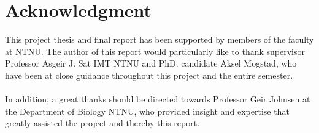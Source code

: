 \chapter*{Acknowledgment}
This project thesis and final report has been supported by members of the faculty at NTNU. The author of this report would particularly like to thank supervisor Professor Asgeir J. S at IMT NTNU and PhD. candidate Aksel Mogstad, who have been at close guidance throughout this project and the entire semester. 
\\\\
In addition, a great thanks should be directed towards Professor Geir Johnsen at the Department of Biology NTNU, who provided insight and expertise that greatly assisted the project and thereby this report.

